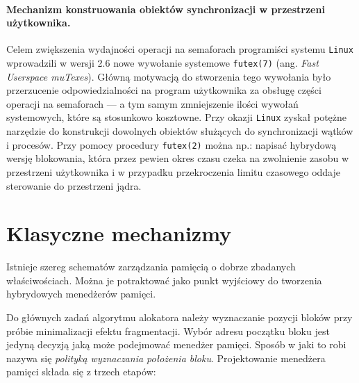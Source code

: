 \documentclass[12pt,a4paper,titlepage,twoside]{mwart}
\begin{document}
\paragraph{Mechanizm konstruowania obiektów synchronizacji w przestrzeni
użytkownika.} Celem zwiększenia wydajności operacji na semaforach programiści
systemu \texttt{Linux} wprowadzili w wersji 2.6 nowe wywołanie systemowe
\verb+futex(7)+ (ang. \textit{Fast Userspace muTexes}). Główną motywacją do
stworzenia tego wywołania było przerzucenie odpowiedzialności na program
użytkownika za obsługę części operacji na semaforach --- a tym samym
zmniejszenie ilości wywołań systemowych, które są stosunkowo kosztowne. Przy
okazji \texttt{Linux} zyskał potężne narzędzie do konstrukcji dowolnych
obiektów służących do synchronizacji wątków i procesów. Przy pomocy procedury
\verb+futex(2)+ można np.: napisać hybrydową wersję blokowania, która przez
pewien okres czasu czeka na zwolnienie zasobu w przestrzeni użytkownika i w
przypadku przekroczenia limitu czasowego oddaje sterowanie do przestrzeni
jądra.

\newpage


\section{Klasyczne mechanizmy}
\hypertarget{Klasyka}{}

Istnieje szereg schematów zarządzania pamięcią o dobrze zbadanych
właściwościach. Można je potraktować jako punkt wyjściowy do tworzenia
hybrydowych menedżerów pamięci.

Do głównych zadań algorytmu alokatora należy wyznaczanie pozycji bloków przy
próbie minimalizacji efektu fragmentacji. Wybór adresu początku bloku jest
jedyną decyzją jaką może podejmować menedżer pamięci. Sposób w jaki to robi
nazywa się \textit{polityką wyznaczania położenia bloku}. Projektowanie
menedżera pamięci składa się z trzech etapów:
\end{document}
